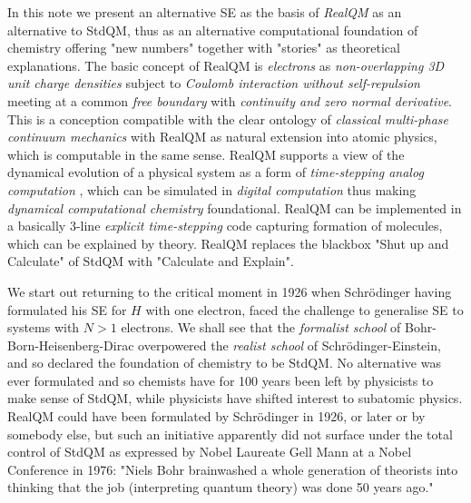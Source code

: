 \documentclass[11pt]{article} %
\begin{document}
In this note we present an alternative SE as the basis of \emph{RealQM} as an alternative to StdQM,  thus as an alternative computational  foundation of chemistry offering "new numbers" together with "stories" as theoretical explanations.  The basic concept of RealQM is \emph{electrons} as \emph{non-overlapping 3D unit charge densities} subject to \emph{Coulomb interaction without self-repulsion} meeting at a common \emph{free boundary} with \emph{continuity and zero normal derivative}.  This is a conception compatible with the clear ontology of \emph{classical multi-phase continuum mechanics} with RealQM as natural extension into atomic physics,  which is computable in the same sense.  RealQM supports a view of the dynamical evolution of a physical system as a form of \emph{time-stepping analog computation} \cite{wolfram},  which can be simulated in \emph{digital computation} thus making \emph{dynamical computational chemistry} foundational.  RealQM can be implemented in a basically 3-line \emph{explicit time-stepping} code capturing formation of molecules,  which can be explained by theory.  RealQM replaces the blackbox "Shut up and Calculate" of StdQM with "Calculate and Explain". 

 

We start out returning to the critical moment in 1926 when Schr\"odinger having formulated his SE for $H$ with one electron,  faced the challenge to generalise SE to systems with $N>1$ electrons.  We shall see that the \emph{formalist school} of Bohr-Born-Heisenberg-Dirac overpowered the \emph{realist school} of Schr\"odinger-Einstein,  and so declared the foundation of chemistry to be StdQM.  No alternative was ever formulated and so chemists have for 100 years been left by physicists to make sense of StdQM,  while physicists have shifted interest to subatomic physics.  
RealQM could have been formulated by Schr\"odinger in 1926,  or later or by somebody else,  but such an initiative apparently did not surface under the total control of StdQM as expressed by Nobel Laureate Gell Mann at a Nobel Conference in 1976: "Niels Bohr brainwashed a whole generation of theorists into thinking that the job (interpreting quantum theory) was done 50 years ago."
\end{document}
